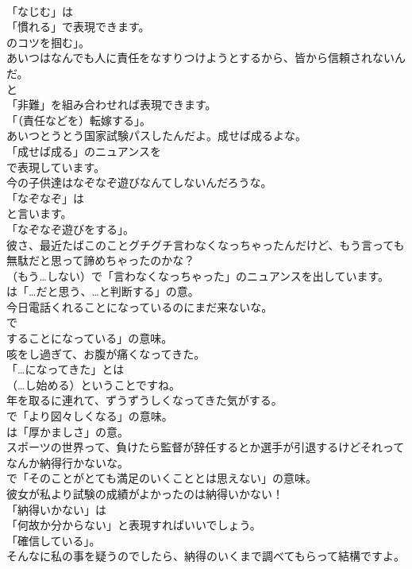 \documentclass[8pt]{extreport}
\begin{document}
\begin{CJK}{UTF8}{min}
\\	「なじむ」は
\\	「慣れる」で表現できます。
\\	のコツを掴む」。	
\\	あいつはなんでも人に責任をなすりつけようとするから、皆から信頼されないんだ。 
\\	と
\\	「非難」を組み合わせれば表現できます。
\\	「（責任などを）転嫁する」。	
\\	あいつとうとう国家試験パスしたんだよ。成せば成るよな。 
\\	「成せば成る」のニュアンスを 
\\	で表現しています。	
\\	今の子供達はなぞなぞ遊びなんてしないんだろうな。 
\\	「なぞなぞ」は
\\	と言います。
\\	「なぞなぞ遊びをする」。	
\\	彼さ、最近たばこのことグチグチ言わなくなっちゃったんだけど、もう言っても無駄だと思って諦めちゃったのかな？ 
\\	（もう…しない）で「言わなくなっちゃった」のニュアンスを出しています。
\\	は「…だと思う、…と判断する」の意。	
\\	今日電話くれることになっているのにまだ来ないな。 
\\	で
\\	することになっている」の意味。	
\\	咳をし過ぎて、お腹が痛くなってきた。 
\\	「…になってきた」とは
\\	（…し始める）ということですね。	
\\	年を取るに連れて、ずうずうしくなってきた気がする。 
\\	で「より図々しくなる」の意味。
\\	は「厚かましさ」の意。	
\\	スポーツの世界って、負けたら監督が辞任するとか選手が引退するけどそれってなんか納得行かないな。 
\\	で「そのことがとても満足のいくこととは思えない」の意味。	
\\	彼女が私より試験の成績がよかったのは納得いかない！ 
\\	「納得いかない」は
\\	「何故か分からない」と表現すればいいでしょう。
\\	「確信している」。	
\\	そんなに私の事を疑うのでしたら、納得のいくまで調べてもらって結構ですよ。 

\end{CJK}
\end{document}
